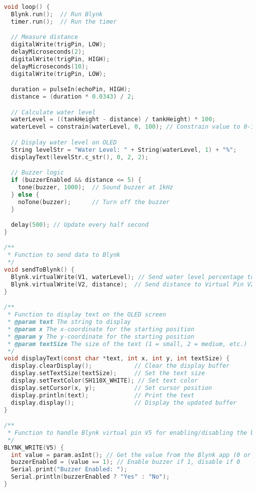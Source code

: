 \begin{lstlisting}[language=C]
void loop() {
  Blynk.run();  // Run Blynk
  timer.run();  // Run the timer

  // Measure distance
  digitalWrite(trigPin, LOW);
  delayMicroseconds(2);
  digitalWrite(trigPin, HIGH);
  delayMicroseconds(10);
  digitalWrite(trigPin, LOW);

  duration = pulseIn(echoPin, HIGH);
  distance = (duration * 0.0343) / 2;

  // Calculate water level
  waterLevel = ((tankHeight - distance) / tankHeight) * 100;
  waterLevel = constrain(waterLevel, 0, 100); // Constrain value to 0-100%

  // Display water level on OLED
  String levelStr = "Water Level: " + String(waterLevel, 1) + "%";
  displayText(levelStr.c_str(), 0, 2, 2);

  // Buzzer logic
  if (buzzerEnabled && distance <= 5) {
    tone(buzzer, 1000);  // Sound buzzer at 1kHz
  } else {
    noTone(buzzer);      // Turn off the buzzer
  }

  delay(500); // Update every half second
}

/**
 * Function to send data to Blynk
 */
void sendToBlynk() {
  Blynk.virtualWrite(V1, waterLevel); // Send water level percentage to Virtual Pin V1
  Blynk.virtualWrite(V2, distance);  // Send distance to Virtual Pin V2 (optional)
}

/**
 * Function to display text on the OLED screen
 * @param text The string to display
 * @param x The x-coordinate for the starting position
 * @param y The y-coordinate for the starting position
 * @param textSize The size of the text (1 = small, 2 = medium, etc.)
 */
void displayText(const char *text, int x, int y, int textSize) {
  display.clearDisplay();            // Clear the display buffer
  display.setTextSize(textSize);     // Set the text size
  display.setTextColor(SH110X_WHITE); // Set text color
  display.setCursor(x, y);           // Set cursor position
  display.println(text);             // Print the text
  display.display();                 // Display the updated buffer
}

/**
 * Function to handle Blynk virtual pin V5 for enabling/disabling the buzzer
 */
BLYNK_WRITE(V5) {
  int value = param.asInt(); // Get the value from the Blynk app (0 or 1)
  buzzerEnabled = (value == 1); // Enable buzzer if 1, disable if 0
  Serial.print("Buzzer Enabled: ");
  Serial.println(buzzerEnabled ? "Yes" : "No");
}

\end{lstlisting}

